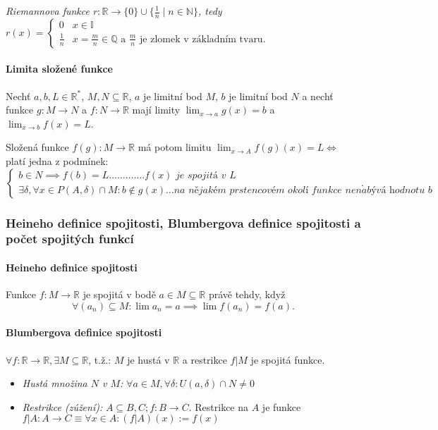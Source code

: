 \documentclass[10pt,a4paper]{article}
\newcommand{\N}{{\mathbb{N}}}
\newcommand{\Q}{{\mathbb{Q}}}
\newcommand{\R}{{\mathbb{R}}}
\begin{document}
\textit{Riemannova funkce $r: \R \to \{0\} \cup \{ \frac 1n \mid n\in \N \}$, tedy
\(
    r(x) = \begin{cases}
        0 & x\in \mathbb{I}\\
        \frac 1n & x = \frac mn \in \Q \text{ a } \frac mn \text{ je zlomek v základním tvaru.}
    \end{cases}
\)}

\paragraph*{Limita složené funkce} Nechť $a,b,L \in \R^*$, $M,N \subseteq \R$, $a$ je limitní bod $M$, 
$b$ je limitní bod $N$ a nechť funkce $g: M\to N$ a $f: N\to \R$ mají limity $\displaystyle \lim_{x\to a}g(x) = b$ a $\displaystyle \lim_{x\to b}f(x) = L$. 

Složená funkce $f(g):M\to \R$ má potom limitu $\lim_{x\to A} f(g)(x) = L \iff$ platí jedna z podmínek:
\[
    \begin{cases}
        b \in N \implies f(b) = L \dots \dots \dots \dots . f(x) \textit{ je spojitá v } L\\
        \exists \delta, \forall x \in P(A, \delta) \cap M: b \notin g(x) \dots \textit{na nějakém prstencovém okolí funkce nenabývá hodnotu } b
    \end{cases}.
\]
\subsubsection{Heineho definice spojitosti, Blumbergova definice spojitosti a počet spojitých funkcí}

\paragraph*{Heineho definice spojitosti} Funkce $f:M\to \R$ je spojitá v bodě $a\in M \subseteq \R$ právě tehdy, když 
\[\forall (a_n) \subseteq M: \lim a_n = a \implies \lim f(a_n) = f(a).\]

\paragraph*{Blumbergova definice spojitosti} $\forall f: \R \to \R, \exists M \subseteq \R$, t.ž.: $M$ je hustá v $\R$ a restrikce $f|M$ je spojitá funkce.

\begin{itemize}
    \item \textit{Hustá množina $N$ v $M$:} $\forall a \in M, \forall \delta: U(a, \delta) \cap N \neq 0$
    \item \textit{Restrikce (zúžení):} $A \subseteq B, C; f:B\to C$. Restrikce na $A$ je funkce $f|A: A\to C\equiv \forall x\in A: (f|A)(x):= f(x)$
\end{itemize}
\end{document}
